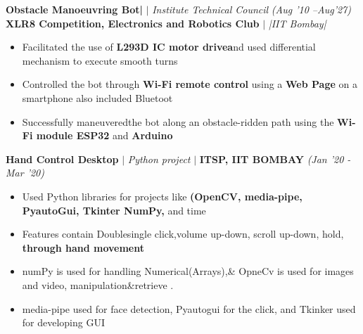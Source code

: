 \documentclass{article}
\begin{document}
\textbf{Obstacle Manoeuvring Bot|} $\vert$ \textit{Institute Technical Council }    \hfill{\textit{(Aug ’10 –Aug’27)}}\\
\vspace{-15.5pt}
\textbf{XLR8 Competition, Electronics and Robotics Club} $\vert$ \textit {|IIT Bombay| }    \\
\vspace{-1.5pt}
\begin{itemize}[label=\textcolor{myblue}{\textbullet},itemsep = -0.5 mm, leftmargin=6mm]
\item Facilitated the use of \textbf{L293D IC motor drive}\textbf and used differential mechanism to execute smooth turns
\item Controlled the bot through \textbf{Wi-Fi remote control} using a \textbf{Web Page} on a smartphone also included Bluetoot
\item Successfully maneuveredthe bot along an obstacle-ridden path using the \textbf{Wi-Fi module ESP32} and  \textbf{Arduino}
\end{itemize}
\vspace{-2pt}
\hspace{-4pt}
\textbf{Hand Control Desktop} $\vert$ \textit{Python project} $\vert$ \textbf{ITSP, IIT BOMBAY}
 \hfill{\textit{(Jan '20 - Mar '20)}}\\
\vspace{-15.5pt}
\begin{itemize}[label=\textcolor{myblue}{\textbullet},itemsep = -0.5 mm, leftmargin=6mm]
\item  Used Python libraries for projects like  \textbf {(OpenCV, media-pipe, PyautoGui, Tkinter NumPy,} and time


\item Features contain Doublesingle click,volume up-down, scroll up-down, hold,  \textbf{through hand movement}

\item numPy is used for handling Numerical(Arrays),& OpneCv is used for images and video, manipulation&retrieve  .

\item media-pipe used for face detection, Pyautogui for the click, and Tkinker used for developing GUI 



\end{itemize}
\vspace{-2pt}
\end{document}
